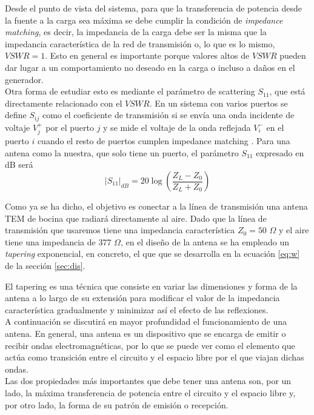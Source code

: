 \documentclass[11pt,a4paper,twoside,pdf]{article}
\numberwithin{equation}{section}
\begin{document}
Desde el punto de vista del sistema, para que la transferencia de potencia desde la fuente a la carga sea máxima se debe cumplir la condición de \textit{impedance matching}, es decir, la impedancia de la carga debe ser la misma que la impedancia característica de la red de transmisión o, lo que es lo mismo, $VSWR = 1$. Esto en general es importante porque valores altos de $VSWR$ pueden dar lugar a un comportamiento no deseado en la carga o incluso a daños en el generador.\\

Otra forma de estudiar esto es mediante el parámetro de scattering $S_{11}$, que está directamente relacionado con el $VSWR$. En un sistema con varios puertos se define $S_{ij}$ como el coeficiente de transmisión si se envía una onda incidente de voltaje $V_j^+$ por el puerto $j$ y se mide el voltaje de la onda reflejada $V_i^-$ en el puerto $i$ cuando el resto de puertos cumplen impedance matching \cite{pozar}. Para una antena como la nuestra, que solo tiene un puerto, el parámetro $S_{11}$ expresado en dB será
\begin{equation}\label{eq:S11}
    |S_{11}|_{dB} = 20\log \left(\frac{Z_L-Z_0}{Z_L+Z_0}\right)
\end{equation}

Como ya se ha dicho, el objetivo es conectar a la línea de transmisión una antena TEM de bocina que radiará directamente al aire. Dado que la línea de transmisión que usaremos tiene una impedancia característica $Z_0=50$ $\Omega$ y el aire tiene una impedancia de 377 $\Omega$, en el diseño de la antena se ha empleado un \textit{tapering} exponencial, en concreto, el que que se desarrolla en la ecuación \ref{eq:w} de la sección \ref{sec:dis}.

El tapering es una técnica que consiste en variar las dimensiones y forma de la antena a lo largo de su extensión para modificar el valor de la impedancia característica gradualmente y minimizar así el efecto de las reflexiones.\\

A continuación se discutirá en mayor profundidad el funcionamiento de una antena. En general, una antena es un dispositivo que se encarga de emitir o recibir ondas electromagnéticas, por lo que se puede ver como el elemento que actúa como transición entre el circuito y el espacio libre por el que viajan dichas ondas.\\

Las dos propiedades más importantes que debe tener una antena son, por un lado, la máxima transferencia de potencia entre el circuito y el espacio libre y, por otro lado, la forma de su patrón de emisión o recepción.
\end{document}
